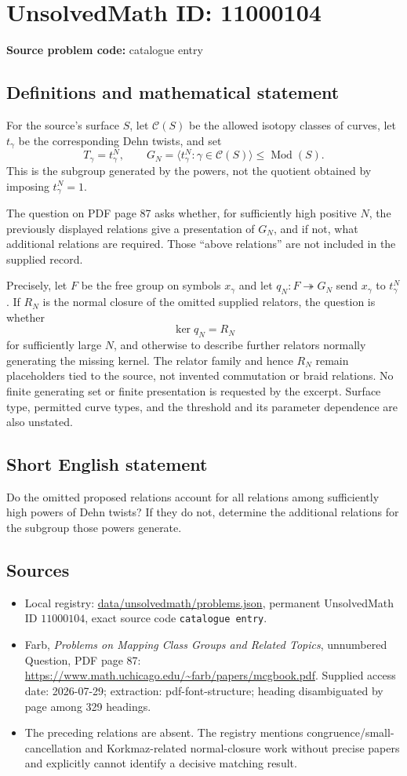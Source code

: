 \documentclass[11pt]{article}
\begin{document}
\section*{UnsolvedMath ID: 11000104}
\textbf{Source problem code:} catalogue entry
\subsection{Definitions and mathematical statement}
For the source's surface $S$, let $\mathcal C(S)$ be the allowed isotopy classes of curves, let $t_\gamma$ be the corresponding Dehn twists, and set
\[
 T_\gamma=t_\gamma^N,\qquad
 G_N=\langle t_\gamma^N:\gamma\in\mathcal C(S)\rangle
 \leq\operatorname{Mod}(S).
\]
This is the subgroup generated by the powers, not the quotient obtained by imposing $t_\gamma^N=1$.

The question on PDF page 87 asks whether, for sufficiently high positive $N$, the previously displayed relations give a presentation of $G_N$, and if not, what additional relations are required. Those ``above relations'' are not included in the supplied record.

Precisely, let $F$ be the free group on symbols $x_\gamma$ and let $q_N:F\twoheadrightarrow G_N$ send $x_\gamma$ to $t_\gamma^N$. If $R_N$ is the normal closure of the omitted supplied relators, the question is whether
\[
 \ker q_N=R_N
\]
for sufficiently large $N$, and otherwise to describe further relators normally generating the missing kernel. The relator family and hence $R_N$ remain placeholders tied to the source, not invented commutation or braid relations. No finite generating set or finite presentation is requested by the excerpt. Surface type, permitted curve types, and the threshold and its parameter dependence are also unstated.
\subsection{Short English statement}
Do the omitted proposed relations account for all relations among sufficiently high powers of Dehn twists? If they do not, determine the additional relations for the subgroup those powers generate.
\subsection{Sources}
\begin{itemize}
\item Local registry: \url{data/unsolvedmath/problems.json}, permanent UnsolvedMath ID $11000104$, exact source code \texttt{catalogue entry}.
\item Farb, \emph{Problems on Mapping Class Groups and Related Topics}, unnumbered Question, PDF page 87: \url{https://www.math.uchicago.edu/~farb/papers/mcgbook.pdf}. Supplied access date: 2026-07-29; extraction: pdf-font-structure; heading disambiguated by page among 329 headings.
\item The preceding relations are absent. The registry mentions congruence/small-cancellation and Korkmaz-related normal-closure work without precise papers and explicitly cannot identify a decisive matching result.
\end{itemize}
\end{document}
